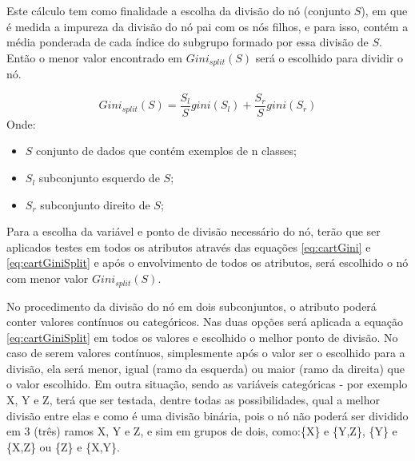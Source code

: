 Este cálculo tem como finalidade a escolha da divisão do nó (conjunto ${S}$), em que é medida a impureza da divisão do nó pai com os nós filhos, e para isso, contém a média ponderada de cada índice do subgrupo formado por essa divisão de ${S}$. Então o menor valor encontrado em ${Gini_{split}(S)}$ será o escolhido para dividir o nó. 

\begin{equation}
Gini_{split}(S) = \frac{S_l}{S}gini(S_l)+\frac{S_r}{S}gini(S_r)
 \label{eq:cartGiniSplit}
\end{equation}
Onde:
\begin{itemize}[noitemsep]
            \item ${S}$ conjunto de dados que contém exemplos de n classes;
            \item ${S_l}$ subconjunto esquerdo de ${S}$;
            \item ${S_r}$ subconjunto direito de ${S}$;
        \end{itemize}

Para a escolha da variável e ponto de divisão necessário do nó, terão que ser aplicados testes em todos os atributos através das equações \ref{eq:cartGini} e \ref{eq:cartGiniSplit} e após o envolvimento de todos os atributos, será escolhido o nó com menor valor ${Gini_{split}(S)}$.




No procedimento da divisão do nó em dois subconjuntos, o atributo poderá conter valores contínuos ou categóricos. Nas duas opções será aplicada a equação \ref{eq:cartGiniSplit} em todos os valores e escolhido o melhor ponto de divisão. No caso de serem valores contínuos, simplesmente após o valor ser o escolhido para a divisão, ela será menor, igual (ramo da esquerda) ou maior (ramo da direita) que o valor escolhido. Em outra situação, sendo as variáveis categóricas - por exemplo X, Y e Z, terá que ser testada, dentre todas as possibilidades, qual a melhor divisão entre elas e como é uma divisão binária, pois o nó não poderá ser dividido em 3 (três) ramos X, Y e Z, e sim em grupos de dois, como:\{X\} e \{Y,Z\}, \{Y\} e \{X,Z\} ou \{Z\} e \{X,Y\}.

